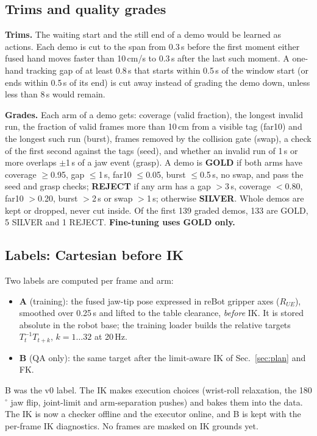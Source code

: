 \documentclass[conference,10pt]{IEEEtran}
\begin{document}
\subsection{Trims and quality grades}\label{sec:trainquality}
\textbf{Trims.} The waiting start and the still end of a demo would be learned as actions. Each demo is cut to the span
from 0.3\,s before the first moment either fused hand moves faster than 10\,cm/s to 0.3\,s after the last such moment. A
one-hand tracking gap of at least 0.8\,s that starts within 0.5\,s of the window start (or ends within 0.5\,s of its end)
is cut away instead of grading the demo down, unless less than 8\,s would remain.

\textbf{Grades.} Each arm of a demo gets: coverage (valid fraction), the longest invalid run, the fraction of valid frames
more than 10\,cm from a visible tag (far10) and the longest such run (burst), frames removed by the collision gate (swap),
a check of the first second against the tags (seed), and whether an invalid run of 1\,s or more overlaps $\pm$1\,s of a jaw
event (grasp). A demo is \textbf{GOLD} if both arms have coverage $\ge$0.95, gap $\le$1\,s, far10 $\le$0.05, burst
$\le$0.5\,s, no swap, and pass the seed and grasp checks; \textbf{REJECT} if any arm has a gap $>$3\,s, coverage $<$0.80,
far10 $>$0.20, burst $>$2\,s or swap $>$1\,s; otherwise \textbf{SILVER}. Whole demos are kept or dropped, never cut inside.
Of the first 139 graded demos, 133 are GOLD, 5 SILVER and 1 REJECT. \textbf{Fine-tuning uses GOLD only.}

\subsection{Labels: Cartesian before IK}\label{sec:trainlabels}
Two labels are computed per frame and arm:
\begin{itemize}
\item \textbf{A} (training): the fused jaw-tip pose expressed in reBot gripper axes ($R_{UE}$), smoothed over 0.25\,s and
  lifted to the table clearance, \emph{before} IK. It is stored absolute in the robot base; the training loader builds the
  relative targets $T_t^{-1}T_{t+k}$, $k=1\ldots32$ at 20\,Hz.
\item \textbf{B} (QA only): the same target after the limit-aware IK of Sec.~\ref{sec:plan} and FK.
\end{itemize}
B was the v0 label. The IK makes execution choices (wrist-roll relaxation, the 180$^\circ$ jaw flip, joint-limit and
arm-separation pushes) and bakes them into the data. The IK is now a checker offline and the executor online, and B is
kept with the per-frame IK diagnostics. No frames are masked on IK grounds yet.
\end{document}
